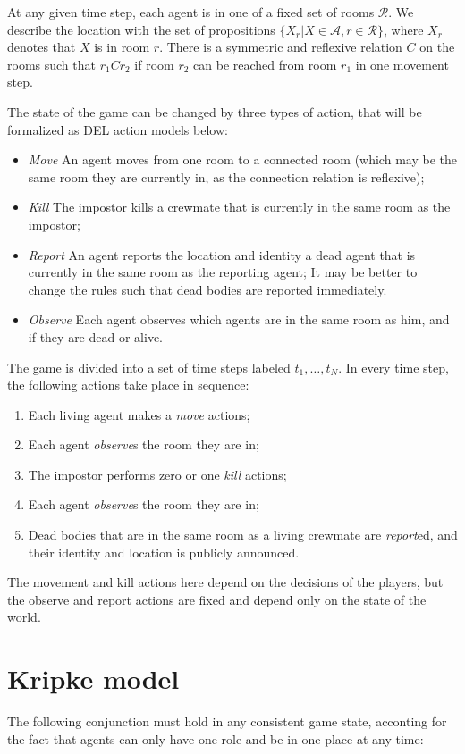\documentclass[a4paper]{scrartcl}
\begin{document}
At any given time step, each agent is in one of a fixed set of rooms $\mathcal{R}$. We describe the location with the set of propositions $\{X_r | X \in \mathcal{A}, r \in \mathcal{R}\}$, where $X_r$ denotes that $X$ is in room $r$. There is a symmetric and reflexive relation $C$ on the rooms such that $r_1 C r_2$ if room $r_2$ can be reached from room $r_1$ in one movement step.

The state of the game can be changed by three types of action, that will be formalized as DEL action models below: 
\begin{itemize}
\item \emph{Move} An agent moves from one room to a connected room (which may be the same room they are currently in, as the connection relation is reflexive);
\item \emph{Kill} The impostor kills a crewmate that is currently in the same room as the impostor;
\item \emph{Report} An agent reports the location and identity a dead agent that is currently in the same room as the reporting agent; It may be better to change the rules such that dead bodies are reported immediately. 
\item \emph{Observe} Each agent observes which agents are in the same room as him, and if they are dead or alive.
\end{itemize}

The game is divided into a set of time steps labeled $t_1, \dots, t_N$. In every time step, the following actions take place in sequence:

\begin{enumerate}
\item Each living agent makes a \emph{move} actions;
\item Each agent \emph{observe}s the room they are in;
\item The impostor performs zero or one \emph{kill} actions;
\item Each agent \emph{observe}s the room they are in;
\item Dead bodies that are in the same room as a living crewmate are \emph{report}ed, and their identity and location is publicly announced.
\end{enumerate}

The movement and kill actions here depend on the decisions of the players, but the observe and report actions are fixed and depend only on the state of the world.  

\section*{Kripke model}
The following conjunction must hold in any consistent game state, acconting for the fact that agents can only have one role and be in one place at any time:
 
\end{document}
